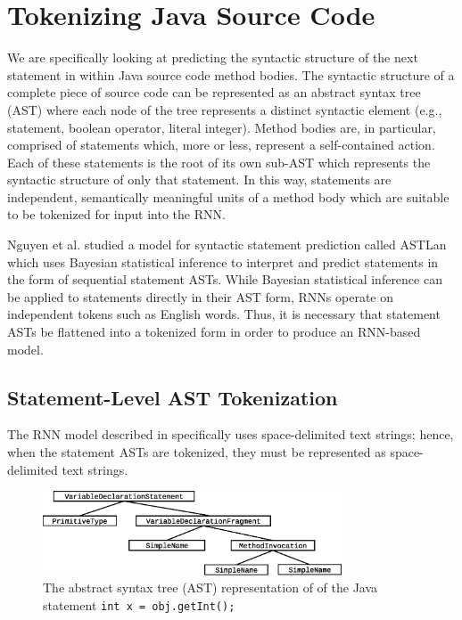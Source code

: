 \documentclass[runningheads,a4paper]{llncs}
\begin{document}


\section{Tokenizing Java Source Code}

We are specifically looking at predicting the syntactic structure  of the next 
statement in within Java source code method bodies. The syntactic structure 
of a complete piece of source code can be represented as an abstract 
syntax tree (AST) where each node of the tree represents a distinct 
syntactic element (e.g., statement, boolean operator, literal integer). 
Method bodies are, in particular, comprised of statements which, more or 
less, represent a self-contained action. Each of these statements is the 
root of its own sub-AST which represents the syntactic structure of only 
that statement. In this way, statements are 
independent, semantically meaningful units of a method body which are suitable 
to be tokenized for input into the RNN.

Nguyen et al. \cite{Nguyen} studied a model for syntactic statement prediction 
called ASTLan which uses Bayesian statistical inference to interpret and 
predict statements in the form of sequential statement ASTs. While Bayesian 
statistical inference can be applied to statements directly in their AST 
form, RNNs operate on independent tokens such as English words. Thus, it is 
necessary that statement ASTs be flattened into a tokenized form in order to 
produce an RNN-based model.

\subsection{Statement-Level AST Tokenization}

The RNN model described in \citet{LSTMArticle} specifically uses space-delimited 
text strings; hence, when the statement ASTs are tokenized, they 
must be represented as space-delimited text strings.

\begin{figure}
\begin{center}
\centerline{\includegraphics[height=25mm]{ast.eps}}
\caption{The abstract syntax tree (AST) representation of of the Java statement
\texttt{int x = obj.getInt();}}
\label{ast-figure}
\end{center}
\vskip -7mm
\end{figure} 
\end{document}
